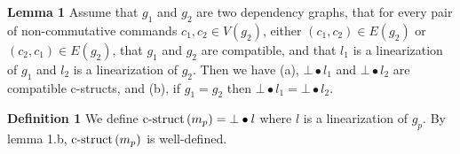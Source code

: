 \textbf{Lemma 1}
Assume that $g_1$ and $g_2$ are two dependency graphs, 
that for every pair of non-commutative commands $c_1,c_2 \in V\left(g_2\right)$, either $\left( c_1,c_2 \right)\in E\left( g_2 \right)$ or $\left( c_2,c_1 \right)\in E\left( g_2 \right)$,
that $g_1$ and $g_2$ are compatible,
and that $l_1$ is a linearization of $g_1$ and $l_2$ is a linearization of $g_2$. 
Then we have (a), $\bot\bullet l_1$ and $\bot\bullet l_2$ are compatible c-structs, and (b), if $g_1 = g_2$ then $\bot\bullet l_1 = \bot\bullet l_2$.

\textbf{Definition 1}
We define $\operatorname{c-struct}\left( m_p \right) = \bot\bullet l$ where $l$ is a linearization of $g_p$.
By lemma 1.b, $\operatorname{c-struct}\left( m_p \right)$ is well-defined.


\begin{comment}

\textbf{Graph of strongly connected components.} Given a graph $g$, let $\hat{g}$ be the graph whose vertices are the strongly connected components of $g$ (represented as sets of vertices) and where there is an edge from $g_1$ to $g_2$ if and only if there are two vertices $v_1$ and $v_2$ of $g$ such that $v_1 \in V\left( g_1 \right)$, $v_2 \in V\left( g_2 \right)$, and $\left( v_1,v_2 \right)\in E\left( g \right)$. Note that the reflexive and transitive closure of $V\left(  \hat{g} \right)$ is necessarily a partial order. 
For example, consider $h$ such that $V\left( h \right)=\aset{c_1,c_2,c_3,c_4}$ and $E\left( h \right)=\aset{\left( c_1,c_2 \right),\left( c_2,c_1 \right),\left( c_1,c_3 \right)}$. Then $V(\hat{h}) = \aset{\aset{c_1,c_2},\aset{c_3},\aset{c_4}}$ and $E( \hat{h} )=\aset{\left( \aset{c_1,c_2},\aset{c_3} \right)}$. We will use $h$ as an example in the rest of the section.

\textbf{Linearization function.} Consider a function $f$ mapping sets of commands to sequences of commands such that $f\left[ cs \right]$ is a total order on the set $cs$.

\textbf{Linearizations of a dependency graph.}
When $\hat{o}$ is a total order over the strongly connected components of $g$ such that $\hat{o} \in \opn{TOs}\left( \hat{g} \right)$, we say that a total order $l$ on $V\left( g \right)$ is a \emph{linearization} of $g$ when $\left(v_1,v_2\right) \in l$ iff (1) there exists $vs_1,vs_2\in V\left(\hat{g}\right)$ such that $v_1\in vs_1$, $v_2\in vs_2$, and $\left( vs_1,vs_2 \right)\in \hat{o}$, or (2) there exists $vs_1\in V\left(\hat{g}\right)$ such that
$v_1,v_2\in  vs_1$ and $\left( v_1,v_2 \right)\in f\left[  vs_1 \right]$.
For example, if $f\left[ \aset{c_1,c_2} \right] = \aseq{c_2,c_1}$ then $\aseq{c_2,c_1,c_3,c_4}$ is a linearization of $h$ but $\aseq{c_1,c_2,c_3,c_4}$ is not and neither is $\aseq{c_3,c_2,c_1,c_4}$

\end{comment}


